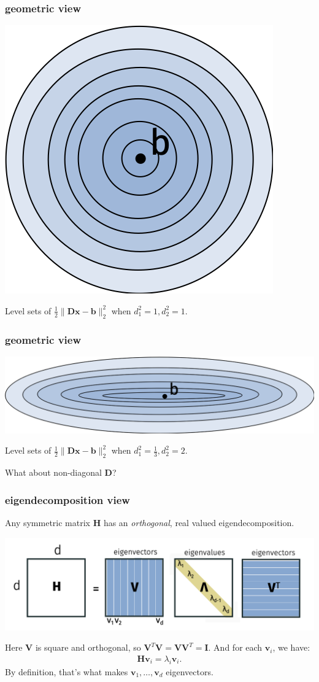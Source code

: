 \documentclass[compress]{beamer}
\newcommand{\bv}[1]{\mathbf{#1}}
\begin{document}
\begin{frame}[t]
	\frametitle{geometric view}
	\begin{center}
		\includegraphics[width=.5\textwidth]{perfect_conditioning.png}
		
		Level sets of $\frac{1}{2}\|\bv{D}\bv{x} - \bv{b}\|_2^2$ when $d_1^2 = 1, d_2^2 = 1$. 
	\end{center}
\end{frame}

\begin{frame}[t]
	\frametitle{geometric view}
	\begin{center}
		\includegraphics[width=\textwidth]{poor_conditioning.png}
		
		Level sets of $\frac{1}{2}\|\bv{D}\bv{x} - \bv{b}\|_2^2$ when $d_1^2 = \frac{1}{3}, d_2^2 = 2$. 
	\end{center}

\vspace{8em}
What about non-diagonal $\bv{D}$?
\end{frame}

\begin{frame}[t]
	\frametitle{eigendecomposition view}
	Any symmetric matrix $\bv{H}$ has an \emph{orthogonal}, real valued eigendecomposition. 
	\begin{center}
		\includegraphics[width=.9\textwidth]{eigendecomp.png}
	\end{center}
	Here $\bv{V}$ is square and orthogonal, so $\bv{V}^T\bv{V} = \bv{V}\bv{V}^T = \bv{I}$. And for each $\bv{v}_i$, we have:
	\begin{align*}
		\bv{H}\bv{v}_i = \lambda_i \bv{v}_i. 
	\end{align*}
	By definition, that's what makes $\bv{v}_1, \ldots, \bv{v}_d$ eigenvectors.	
\end{frame}
\end{document}
